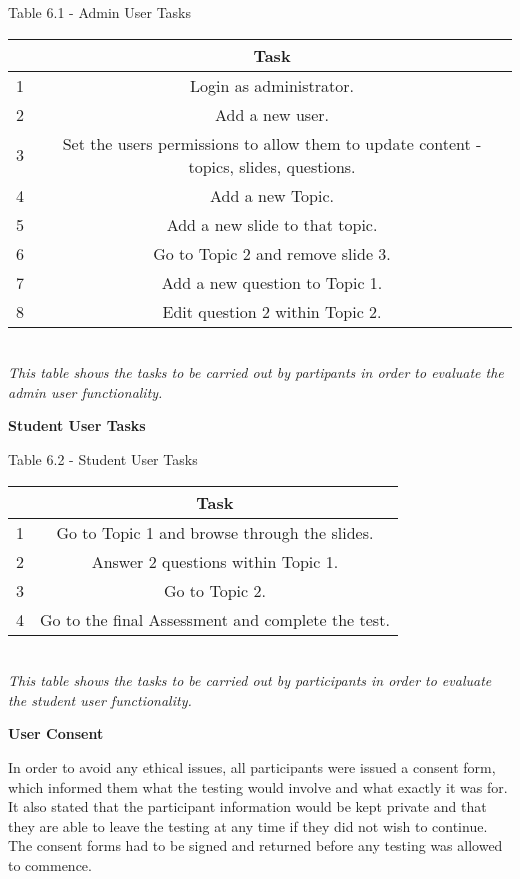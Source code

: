 \documentclass{l3proj}
\begin{document}
\begin{center}
Table 6.1 - Admin User Tasks
\begin{tabular}{|c|c|}
\hline & \textbf{Task}\\
\hline
\hline 1 & Login as administrator.\\
\hline 2 & Add a new user.\\
\hline 3 & Set the users permissions to allow them to update content - topics, slides, questions.\\
\hline 4 & Add a new Topic.\\
\hline 5 & Add a new slide to that topic.\\
\hline 6 & Go to Topic 2 and remove slide 3.\\
\hline 7 & Add a new question to Topic 1.\\
\hline 8 & Edit question 2 within Topic 2.\\
\hline
\end{tabular}\\
\textit{{\small This table shows the tasks to be carried out by partipants in order to evaluate the admin user functionality.}}
\end{center}

\textbf{Student User Tasks}

\begin{center}
Table 6.2 - Student User Tasks\\
\begin{tabular}{|c|c|}
\hline & \textbf{Task}\\
\hline
\hline 1 &  Go to Topic 1 and browse through the slides.\\
\hline 2 & Answer 2 questions within Topic 1.\\
\hline 3 & Go to Topic 2.\\
\hline 4 & Go to the final Assessment and complete the test.\\
\hline
\end{tabular}\\
\textit{{\small This table shows the tasks to be carried out by participants in order to evaluate the student user functionality.}}
\end{center}

\textbf{User Consent}

In order to avoid any ethical issues, all participants were issued a consent form, which informed them what the testing would involve and what exactly it was for.  It also stated that the participant information would be kept private and that they are able to leave the testing at any time if they did not wish to continue. The consent forms had to be signed and returned before any testing was allowed to commence.
\end{document}
